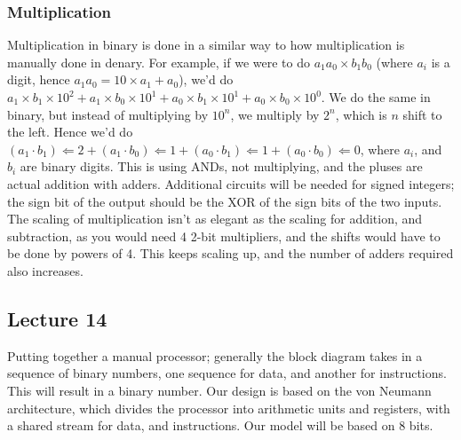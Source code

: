 \documentclass[a4paper, 12pt]{article}
\begin{document}
            \subsubsection*{Multiplication}
                Multiplication in binary is done in a similar way to how multiplication is manually done in denary. For example, if we were to do $a_1a_0 \times b_1b_0$ (where $a_i$ is a digit, hence $a_1a_0 = 10 \times a_1 + a_0$), we'd do $a_1 \times b_1 \times 10^2 + a_1 \times b_0 \times 10^1 + a_0 \times b_1 \times 10^1 + a_0 \times b_0 \times 10^0$. We do the same in binary, but instead of multiplying by $10^n$, we multiply by $2^n$, which is $n$ shift to the left. Hence we'd do $(a_1 \cdot b_1) \Leftarrow 2 + (a_1 \cdot b_0) \Leftarrow 1 + (a_0 \cdot b_1) \Leftarrow 1 + (a_0 \cdot b_0) \Leftarrow 0$, where $a_i$, and $b_i$ are binary digits. This is using ANDs, not multiplying, and the pluses are actual addition with adders. Additional circuits will be needed for signed integers; the sign bit of the output should be the XOR of the sign bits of the two inputs. The scaling of multiplication isn't as elegant as the scaling for addition, and subtraction, as you would need 4 2-bit multipliers, and the shifts would have to be done by powers of 4. This keeps scaling up, and the number of adders required also increases.
        \subsection*{Lecture 14}
            Putting together a manual processor; generally the block diagram takes in a sequence of binary numbers, one sequence for data, and another for instructions. This will result in a binary number. Our design is based on the von Neumann architecture, which divides the processor into arithmetic units and registers, with a shared stream for data, and instructions. Our model will be based on 8 bits.
            \medskip
\end{document}

